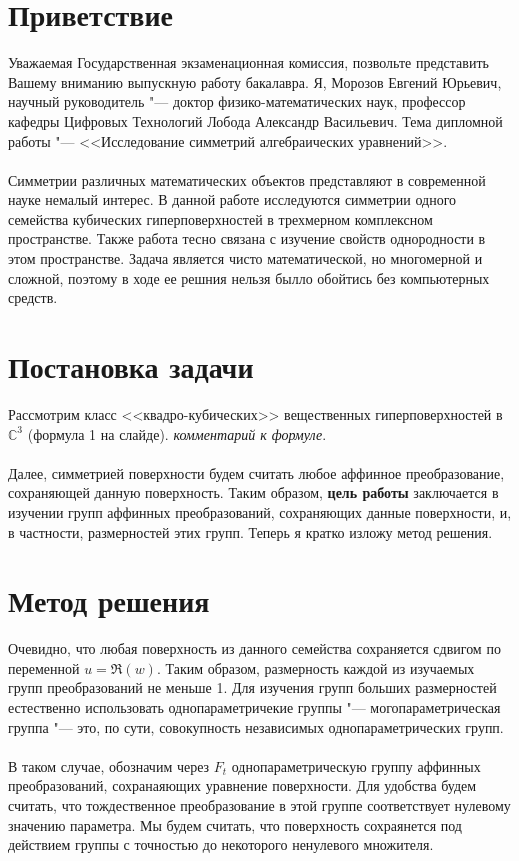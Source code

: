 \documentclass[a4paper,14pt]{extarticle}
\begin{document}
\section{Приветствие}
Уважаемая Государственная экзаменационная комиссия, позвольте представить Вашему вниманию выпускную работу бакалавра. Я, Морозов Евгений Юрьевич, научный руководитель "--- доктор физико-математических наук, профессор кафедры Цифровых Технологий Лобода Александр Васильевич. Тема дипломной работы "--- <<Исследование симметрий алгебраических уравнений>>.
\\~\\
Симметрии различных математических объектов представляют в современной науке немалый интерес. В данной работе исследуются симметрии одного семейства кубических гиперповерхностей в трехмерном комплексном пространстве. Также работа тесно связана с изучение свойств однородности в этом пространстве. Задача является чисто математической, но многомерной и сложной, поэтому в ходе ее решния нельзя былло обойтись без компьютерных средств.


\section{Постановка задачи}
Рассмотрим класс <<квадро-кубических>> вещественных гиперповерхностей в $\mathbb{C}^3$ (формула 1 на слайде). \textit{комментарий к формуле}.
\\~\\
Далее, симметрией поверхности будем считать любое аффинное преобразование, сохраняющей данную поверхность. Таким образом, \textbf{цель работы} заключается в изучении групп аффинных преобразований, сохраняющих данные поверхности, и, в частности, размерностей этих групп. Теперь я кратко изложу метод решения.

\section{Метод решения}
Очевидно, что любая поверхность из данного семейства сохраняется сдвигом по переменной $u = \Re(w)$. Таким образом, размерность каждой из изучаемых групп преобразований не меньше 1. Для изучения групп больших размерностей естественно использовать однопараметричекие группы "--- могопараметрическая группа "--- это, по сути, совокупность независимых однопараметрических групп.
\\~\\
В таком случае, обозначим через $F_t$ однопараметрическую группу аффинных преобразований, сохранаяющих уравнение поверхности. Для удобства будем считать, что тождественное преобразование в этой группе соответствует нулевому значению параметра. Мы будем считать, что поверхность сохраянется под действием группы с точностью до некоторого ненулевого множителя.
\end{document}

